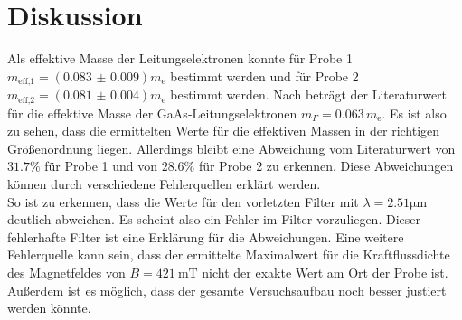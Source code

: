 \section{Diskussion}
\label{sec:Diskussion}
Als effektive Masse der Leitungselektronen konnte für Probe 1 $m_\text{eff,1} = (\num{0.083(9)})  m_\text{e}$ bestimmt werden und für Probe 2 $m_\text{eff,2} = (\num{0.081(4)}) m_\text{e}$ bestimmt werden. Nach \cite{mass} beträgt der Literaturwert für die effektive Masse der GaAs-Leitungselektronen $m_{\Gamma} = \num{0.063} \, m_\text{e}$. Es ist also zu sehen, dass die ermittelten Werte für die effektiven Massen in der richtigen Größenordnung liegen. Allerdings bleibt eine Abweichung vom Literaturwert von $31.7\%$ für Probe 1 und von $28.6\%$ für Probe 2 zu erkennen. Diese Abweichungen können durch verschiedene Fehlerquellen erklärt werden.\\
\newline
\noindent
So ist zu erkennen, dass die Werte für den vorletzten Filter mit $\lambda=2.51 \si{\micro\meter}$ deutlich abweichen. Es scheint also ein Fehler im Filter vorzuliegen. Dieser fehlerhafte Filter ist eine Erklärung für die Abweichungen. Eine weitere Fehlerquelle kann sein, dass der ermittelte Maximalwert für die Kraftflussdichte des Magnetfeldes von $B = \SI{421}{\milli\tesla}$ nicht der exakte Wert am Ort der Probe ist. Außerdem ist es möglich, dass der gesamte Versuchsaufbau noch besser justiert werden könnte.